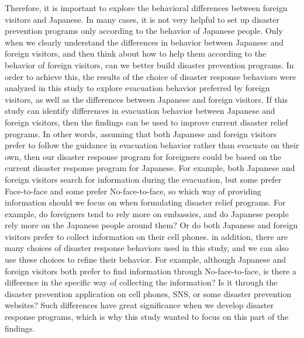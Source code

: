 Therefore, it is important to explore the behavioral differences between foreign visitors and Japanese. In many cases, it is not very helpful to set up disaster prevention programs only according to the behavior of Japanese people. Only when we clearly understand the differences in behavior between Japanese and foreign visitors, and then think about how to help them according to the behavior of foreign visitors, can we better build disaster prevention programs. In order to achieve this, the results of the choice of disaster response behaviors were analyzed in this study to explore evacuation behavior preferred by foreign visitors, as well as the differences between Japanese and foreign visitors.  If this study can identify differences in evacuation behavior between Japanese and foreign visitors, then the findings can be used to improve current disaster relief programs. In other words, assuming that both Japanese and foreign visitors prefer to follow the guidance in evacuation behavior rather than evacuate on their own, then our disaster response program for foreigners could be based on the current disaster response program for Japanese. For example, both Japanese and foreign visitors search for information during the evacuation, but some prefer Face-to-face and some prefer No-face-to-face, so which way of providing information should we focus on when formulating disaster relief programs. For example, do foreigners tend to rely more on embassies, and do Japanese people rely more on the Japanese people around them? Or do both Japanese and foreign visitors prefer to collect information on their cell phones. in addition, there are many choices of disaster response behaviors used in this study, and we can also use these choices to refine their behavior. For example, although Japanese and foreign visitors both prefer to find information through No-face-to-face, is there a difference in the specific way of collecting the information? Is it through the disaster prevention application on cell phones, SNS, or some disaster prevention websites? Such differences have great significance when we develop disaster response programs, which is why this study wanted to focus on this part of the findings.


